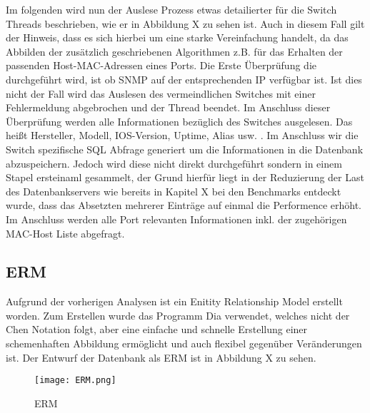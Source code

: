 Im folgenden wird nun der Auslese Prozess etwas detailierter für die Switch Threads beschrieben, wie er in Abbildung X zu sehen ist. Auch in diesem Fall gilt der Hinweis, dass es sich hierbei um eine starke Vereinfachung handelt, da das Abbilden der zusätzlich geschriebenen Algorithmen z.B. für das Erhalten der passenden Host-MAC-Adressen eines Ports. 
Die Erste Überprüfung die durchgeführt wird, ist ob SNMP auf der entsprechenden IP verfügbar ist. Ist dies nicht der Fall wird das Auslesen des vermeindlichen Switches mit einer Fehlermeldung abgebrochen und der Thread beendet. Im Anschluss dieser Überprüfung werden alle Informationen bezüglich des Switches ausgelesen. Das heißt Hersteller, Modell, IOS-Version, Uptime, Alias usw. . Im Anschluss wir die Switch spezifische SQL Abfrage generiert um die Informationen in die Datenbank abzuspeichern. Jedoch wird diese nicht direkt durchgeführt sondern in einem Stapel ersteinaml gesammelt, der Grund hierfür liegt in der Reduzierung der Last des Datenbankservers wie bereits in Kapitel X bei den Benchmarks entdeckt wurde, dass das Absetzten mehrerer Einträge auf einmal die Performence erhöht.
Im Anschluss werden alle Port relevanten Informationen inkl. der zugehörigen MAC-Host Liste abgefragt.

\subsection{ERM}
\label{subsec:erm-diagram}

Aufgrund der vorherigen Analysen ist ein Enitity Relationship Model erstellt
worden. Zum Erstellen wurde das Programm Dia verwendet, welches nicht der Chen
Notation folgt, aber eine einfache und schnelle Erstellung einer schemenhaften Abbildung ermöglicht und auch flexibel gegenüber Veränderungen ist.
Der Entwurf der Datenbank als ERM ist in Abbildung X zu sehen.

\begin{figure}[H]
\centering
\texttt{[image: ERM.png]}
\caption{ERM}
\label{fig:erm}
\end{figure}

